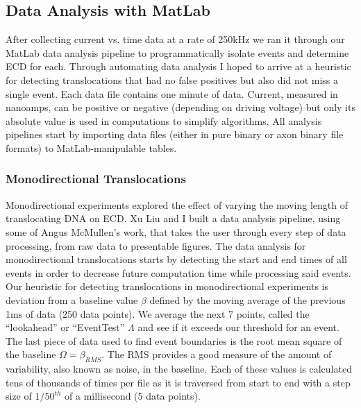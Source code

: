 \documentclass[aps,prl,preprint,groupedaddress]{revtex4}
\begin{document}
\subsection{Data Analysis with MatLab}

After collecting current vs. time data at a rate of 250kHz we ran it through our MatLab data analysis pipeline to programmatically isolate events and determine ECD for each.
Through automating data analysis I hoped to arrive at a heuristic for detecting translocations that had no false positives but also did not miss a single event.
Each data file contains one minute of data.
Current, measured in nanoamps, can be positive or negative (depending on driving voltage) but only its absolute value is used in computations to simplify algorithms.
All analysis pipelines start by importing data files (either in pure binary or axon binary file formats) to MatLab-manipulable tables.

\subsubsection{Monodirectional Translocations}

Monodirectional experiments explored the effect of varying the moving length of translocating DNA on ECD.
Xu Liu and I built a data analysis pipeline, using some of Angus McMullen's work, that takes the user through every step of data processing, from raw data to presentable figures.
The data analysis for monodirectional translocations starts by detecting the start and end times of all events in order to decrease future computation time while processing said events.
Our heuristic for detecting translocations in monodirectional experiments is deviation from a baseline value \(\beta\) defined by the moving average of the previous 1ms of data (250 data points).
We average the next 7 points, called the ``lookahead'' or ``EventTest'' \(\Lambda\) and see if it exceeds our threshold for an event.
The last piece of data used to find event boundaries is the root mean square of the baseline \(\Omega = \beta_{RMS}\).
The RMS provides a good measure of the amount of variability, also known as noise, in the baseline.
Each of these values is calculated tens of thousands of times per file as it is traversed from start to end with a step size of \(1/50^{th}\) of a millisecond (5 data points).
\end{document}
